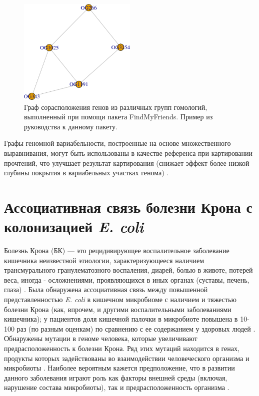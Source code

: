 \begin{figure}[!ht] 
  \center
  \includegraphics [width=0.5\textwidth] {Dissertation/images/lit/Rfriends.png}
  \caption{Граф сорасположения генов из различных групп гомологий, выполненный при помощи пакета FindMyFriends. Пример из руководства к данному пакету. } 
  \label{img:rfriends}  
\end{figure}



Графы геномной вариабельности, построенные на основе множественного выравнивания, могут быть использованы в качестве референса при картировании прочтений, что улучшает результат картирования (снижает эффект более низкой глубины покрытия в вариабельных участках генома) \cite{paten2011cactus, garrison2018variation}. 



\section{Ассоциативная связь болезни Крона с колонизацией \textit{E. coli}}

Болезнь Крона (БК) --- это рецидивирующее воспалительное заболевание кишечника неизвестной этиологии, характеризующееся наличием трансмурального гранулематозного воспаления, диарей, болью в животе, потерей веса, иногда - осложнениями, проявляющихся в иных органах (суставы, печень, глаза) \cite{chervy2020adherent}. Была обнаружена ассоциативная связь между повышенной представленностью \textit{E. coli} в кишечном микробиоме с наличием и тяжестью болезни Крона (как, впрочем, и другими воспалительными заболеваниями кишечника); у пациентов доля кишечной палочки в микробиоте повышена в 10-100 раз (по разным оценкам) по сравнению с ее содержанием у здоровых людей \cite{swidsinski2002mucosal, neut2002changes, miquel2010complete, gevers2014treatment}. Обнаружены мутации в геноме человека, которые увеличивают предрасположенность к болезни Крона. Ряд этих мутаций находится в генах, продукты которых задействованы во взаимодействии человеческого организма и микробиоты  \cite{younis2020inflammatory}. Наиболее вероятным кажется предположение, что в развитии данного заболевания играют роль как факторы внешней среды (включая, нарушение состава микробиоты), так и предрасположенность организма \cite{younis2020inflammatory}. 

